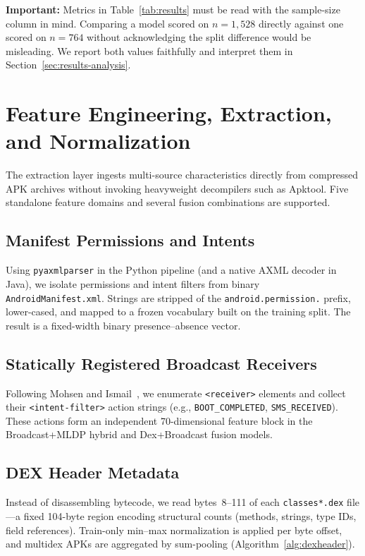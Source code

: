 \textbf{Important:} Metrics in Table~\ref{tab:results} must be read with the sample-size column in mind. Comparing a model scored on $n{=}1{,}528$ directly against one scored on $n{=}764$ without acknowledging the split difference would be misleading. We report both values faithfully and interpret them in Section~\ref{sec:results-analysis}.

\section{Feature Engineering, Extraction, and Normalization}

The extraction layer ingests multi-source characteristics directly from compressed APK archives without invoking heavyweight decompilers such as Apktool. Five standalone feature domains and several fusion combinations are supported.

\subsection{Manifest Permissions and Intents}
Using \texttt{pyaxmlparser} in the Python pipeline (and a native AXML decoder in Java), we isolate permissions and intent filters from binary \texttt{AndroidManifest.xml}. Strings are stripped of the \texttt{android.permission.} prefix, lower-cased, and mapped to a frozen vocabulary built on the training split. The result is a fixed-width binary presence--absence vector.

\subsection{Statically Registered Broadcast Receivers}
Following Mohsen and Ismail~\cite{broadcast}, we enumerate \texttt{<receiver>} elements and collect their \texttt{<intent-filter>} action strings (e.g., \texttt{BOOT\_COMPLETED}, \texttt{SMS\_RECEIVED}). These actions form an independent 70-dimensional feature block in the Broadcast+MLDP hybrid and Dex+Broadcast fusion models.

\subsection{DEX Header Metadata}
Instead of disassembling bytecode, we read bytes~8--111 of each \texttt{classes*.dex} file---a fixed 104-byte region encoding structural counts (methods, strings, type IDs, field references). Train-only min--max normalization is applied per byte offset, and multidex APKs are aggregated by sum-pooling (Algorithm~\ref{alg:dexheader}).

